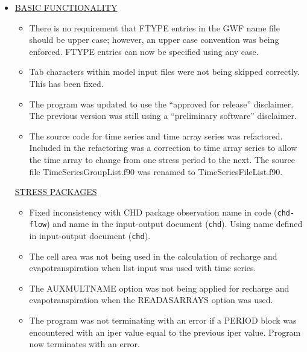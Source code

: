 \documentclass[11pt,twoside,twocolumn]{usgsreport}
\begin{document}
\begin{itemize}

\item 
\currentmodflowversion

\underline{BASIC FUNCTIONALITY}
\begin{itemize}
\item There is no requirement that FTYPE entries in the GWF name file should be upper case; however, an upper case convention was being enforced.  FTYPE entries can now be specified using any case.
\item Tab characters within model input files were not being skipped correctly.  This has been fixed.
\item The program was updated to use the ``approved for release'' disclaimer.  The previous version was still using a ``preliminary software'' disclaimer.
\item The source code for time series and time array series was refactored.  Included in the refactoring was a correction to time array series to allow the time array to change from one stress period to the next.  The source file TimeSeriesGroupList.f90 was renamed to TimeSeriesFileList.f90.
\end{itemize}

\underline{STRESS PACKAGES}
\begin{itemize}
\item Fixed inconsistency with CHD package observation name in code (\texttt{chd-flow}) and name in the input-output document (\texttt{chd}). Using name defined in input-output document (\texttt{chd}).
\item The cell area was not being used in the calculation of recharge and evapotranspiration when list input was used with time series.
\item The AUXMULTNAME option was not being applied for recharge and evapotranspiration when the READASARRAYS option was used.
\item The program was not terminating with an error if a PERIOD block was encountered with an iper value equal to the previous iper value.  Program now terminates with an error.
\end{itemize}


\end{itemize}
\end{document}
